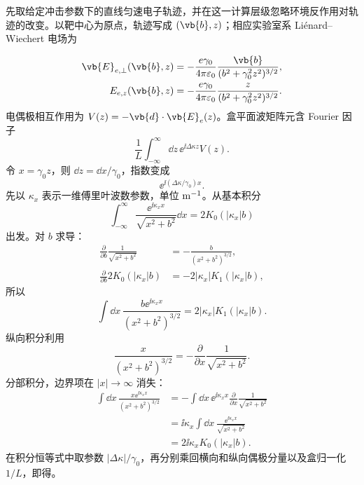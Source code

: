 \begin{derivation}
先取给定冲击参数下的直线匀速电子轨迹，并在这一计算层级忽略环境反作用对轨迹的改变。以靶中心为原点，轨迹写成 $(\vb{b},z)$；相应实验室系 Liénard--Wiechert 电场为

\begin{align*}
\vb{E}_{e,\perp}(\vb{b},z)
&=-\frac{e\gamma_0}{4\pi\varepsilon_0}
\frac{\vb{b}}{(b^2+\gamma_0^2z^2)^{3/2}},\\
E_{e,z}(\vb{b},z)
&=-\frac{e\gamma_0}{4\pi\varepsilon_0}
\frac{z}{(b^2+\gamma_0^2z^2)^{3/2}}.
\end{align*}
电偶极相互作用为 $V(z)=-\vb{d}\cdot\vb{E}_e(z)$。盒平面波矩阵元含 Fourier 因子
\[
\frac1L\int_{-\infty}^{\infty}\dd z\,
\ee^{\ii\Delta\kappa z}V(z).
\]
令 $x=\gamma_0z$，则 $\dd z=\dd x/\gamma_0$，指数变成
\[
\ee^{\ii(\Delta\kappa/\gamma_0)x}.
\]
先以 $\kappa_x$ 表示一维傅里叶波数参数，单位 ${\rm m^{-1}}$。从基本积分
\[
\int_{-\infty}^{\infty}\frac{\ee^{\ii\kappa_x x}}{\sqrt{x^2+b^2}}\dd x
=2K_0(|\kappa_x|b)
\]
出发。对 $b$ 求导：
\begin{align*}
\frac{\partial}{\partial b}
\frac1{\sqrt{x^2+b^2}}
&=-\frac{b}{(x^2+b^2)^{3/2}},\\
\frac{\partial}{\partial b}2K_0(|\kappa_x|b)
&=-2|\kappa_x|K_1(|\kappa_x|b),
\end{align*}
所以
\[
\int\dd x\,
\frac{b\ee^{\ii\kappa_x x}}{(x^2+b^2)^{3/2}}
=2|\kappa_x|K_1(|\kappa_x|b).
\]
纵向积分利用
\[
\frac{x}{(x^2+b^2)^{3/2}}
=-\frac{\partial}{\partial x}
\frac1{\sqrt{x^2+b^2}}.
\]
分部积分，边界项在 $|x|\to\infty$ 消失：
\begin{align*}
\int\dd x\,
\frac{x\ee^{\ii\kappa_x x}}{(x^2+b^2)^{3/2}}
&=-\int\dd x\,\ee^{\ii\kappa_x x}
\frac{\partial}{\partial x}
\frac1{\sqrt{x^2+b^2}}\\
&=\ii\kappa_x\int\dd x\,
\frac{\ee^{\ii\kappa_x x}}{\sqrt{x^2+b^2}}\\
&=2\ii\kappa_xK_0(|\kappa_x|b).
\end{align*}
在积分恒等式中取参数 $|\Delta\kappa|/\gamma_0$，再分别乘回横向和纵向偶极分量以及盒归一化 $1/L$，即得。
\end{derivation}

